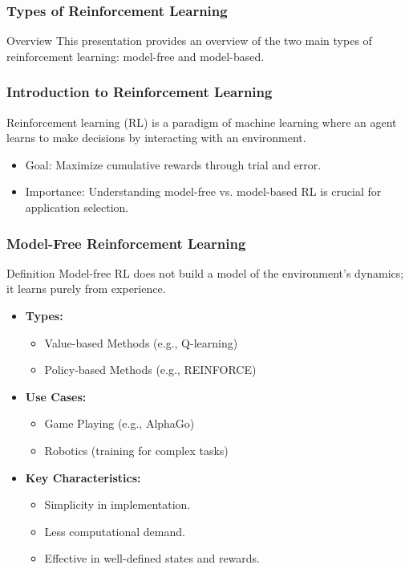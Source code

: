 \documentclass[aspectratio=169]{beamer}
\begin{document}
\begin{frame}[fragile]
    \frametitle{Types of Reinforcement Learning}
    \begin{block}{Overview}
        This presentation provides an overview of the two main types of reinforcement learning: model-free and model-based.
    \end{block}
\end{frame}

\begin{frame}[fragile]
    \frametitle{Introduction to Reinforcement Learning}
    Reinforcement learning (RL) is a paradigm of machine learning where an agent learns to make decisions by interacting with an environment.
    
    \begin{itemize}
        \item Goal: Maximize cumulative rewards through trial and error.
        \item Importance: Understanding model-free vs. model-based RL is crucial for application selection.
    \end{itemize}
\end{frame}

\begin{frame}[fragile]
    \frametitle{Model-Free Reinforcement Learning}
    \begin{block}{Definition}
        Model-free RL does not build a model of the environment's dynamics; it learns purely from experience.
    \end{block}

    \begin{itemize}
        \item \textbf{Types:}
        \begin{itemize}
            \item Value-based Methods (e.g., Q-learning)
            \item Policy-based Methods (e.g., REINFORCE)
        \end{itemize}
        
        \item \textbf{Use Cases:}
        \begin{itemize}
            \item Game Playing (e.g., AlphaGo)
            \item Robotics (training for complex tasks)
        \end{itemize}
        
        \item \textbf{Key Characteristics:}
        \begin{itemize}
            \item Simplicity in implementation.
            \item Less computational demand.
            \item Effective in well-defined states and rewards.
        \end{itemize}
    \end{itemize}
\end{frame}
\end{document}
